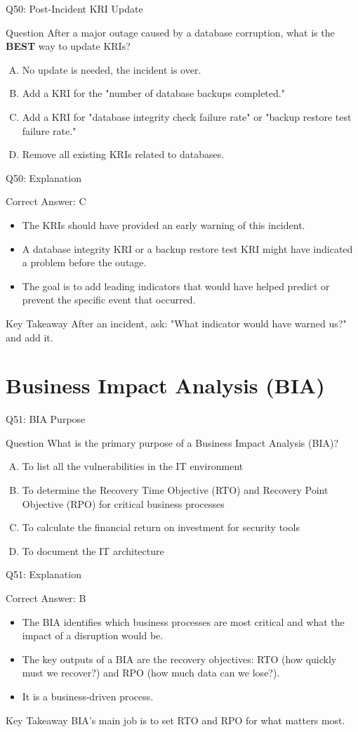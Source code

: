 \documentclass[aspectratio=169]{beamer}
\newcommand{\hq}[7]{%
	\begin{frame}{Q#1: #2}
		\begin{block}{Question}
			#3
		\end{block}
		\begin{enumerate}[(A)]
			#4
		\end{enumerate}
	\end{frame}
	\begin{frame}{Q#1: Explanation}
		\begin{block}{Correct Answer: #5}
			\begin{itemize}
				#6
			\end{itemize}
		\end{block}
		\begin{alertblock}{Key Takeaway}
			#7
		\end{alertblock}
	\end{frame}
}
\begin{document}
	\hq{50}{Post-Incident KRI Update}
	{After a major outage caused by a database corruption, what is the \textbf{BEST} way to update KRIs?}
	{\item No update is needed, the incident is over.
		\item Add a KRI for the "number of database backups completed."
		\item Add a KRI for "database integrity check failure rate" or "backup restore test failure rate."
		\item Remove all existing KRIs related to databases.}
	{C}
	{\item The KRIs should have provided an early warning of this incident.
		\item A database integrity KRI or a backup restore test KRI might have indicated a problem before the outage.
		\item The goal is to add leading indicators that would have helped predict or prevent the specific event that occurred.}
	{After an incident, ask: "What indicator would have warned us?" and add it.}
	
	\section{Business Impact Analysis (BIA)}
	
	\hq{51}{BIA Purpose}
	{What is the primary purpose of a Business Impact Analysis (BIA)?}
	{\item To list all the vulnerabilities in the IT environment
		\item To determine the Recovery Time Objective (RTO) and Recovery Point Objective (RPO) for critical business processes
		\item To calculate the financial return on investment for security tools
		\item To document the IT architecture}
	{B}
	{\item The BIA identifies which business processes are most critical and what the impact of a disruption would be.
		\item The key outputs of a BIA are the recovery objectives: RTO (how quickly must we recover?) and RPO (how much data can we lose?).
		\item It is a business-driven process.}
	{BIA's main job is to set RTO and RPO for what matters most.}
	
\end{document}
